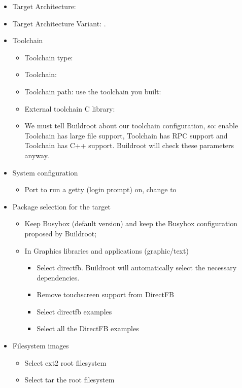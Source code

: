 \begin{itemize}
\item Target Architecture: 
\item Target Architecture Variant: .
\item Toolchain
  \begin{itemize}
  \item Toolchain type: 
  \item Toolchain: 
  \item Toolchain path: use the toolchain you built:
  \item External toolchain C library: 
  \item We must tell Buildroot about our toolchain configuration, so:
    enable Toolchain has large file support, Toolchain has RPC support
    and Toolchain has C++ support. Buildroot will check these
    parameters anyway.
  \end{itemize}
\item System configuration
  \begin{itemize}
  \item Port to run a getty (login prompt) on, change  to 
  \end{itemize}
\item Package selection for the target
  \begin{itemize}
  \item Keep Busybox (default version) and keep the Busybox
    configuration proposed by Buildroot;
  \item In Graphics libraries and applications (graphic/text)
    \begin{itemize}
    \item Select directfb. Buildroot will automatically select the
      necessary dependencies.
    \item Remove touchscreen support from DirectFB
    \item Select directfb examples
    \item Select all the DirectFB examples
    \end{itemize}
  \end{itemize}
\item Filesystem images
  \begin{itemize}
  \item Select ext2 root filesystem
  \item Select tar the root filesystem
  \end{itemize}
\end{itemize}

